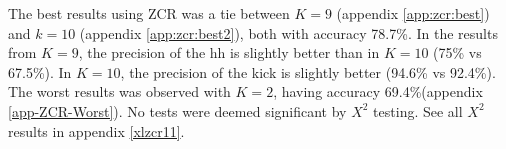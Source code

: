 %			
		

		The best results using ZCR was a tie between $K=9$ (appendix \ref{app:zcr:best}) and $k=10$ (appendix \ref{app:zcr:best2}), both with accuracy 78.7\%. In the results from $K=9$, the precision of the hh is slightly better than in $K=10$ (75\% vs 67.5\%). In $K=10$, the precision of the kick is slightly better (94.6\% vs 92.4\%). The worst results was observed with $K=2$, having accuracy 69.4\%(appendix \ref{app-ZCR-Worst}). No tests were deemed significant by $X^2$ testing. See all $X^2$ results in appendix \ref{xlzcr11}.
		
		
